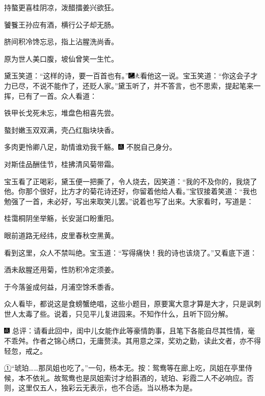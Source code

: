 持螯更喜桂阴凉，泼醋擂姜兴欲狂。

饕餮王孙应有酒，横行公子却无肠。

脐间积冷馋忘忌，指上沾腥洗尚香。

原为世人美口腹，坡仙曾笑一生忙。

黛玉笑道：``这样的诗，要一百首也有。''{\includegraphics[width=3mm]{../Images/00003}\includegraphics[width=3mm]{../Images/00012}\footnotesize \kaishu 看他这一说。}宝玉笑道：``你这会子才力已尽，不说不能作了，还贬人家。''黛玉听了，并不答言，也不思索，提起笔来一挥，已有了一首。众人看道：

铁甲长戈死未忘，堆盘色相喜先尝。

螯封嫩玉双双满，壳凸红脂块块香。

多肉更怜卿八足，助情谁劝我千觞。{\includegraphics[width=3mm]{../Images/00005}  \kaishu 不脱自己身分。}

对斯佳品酬佳节，桂拂清风菊带霜。

宝玉看了正喝彩，黛玉便一把撕了，令人烧去，因笑道：``我的不及你的，我烧了他。你那个很好，比方才的菊花诗还好，你留着他给人看。''宝钗接着笑道：``我也勉强了一首，未必好，写出来取笑儿罢。''说着也写了出来。大家看时，写道是：

桂霭桐阴坐举觞，长安涎口盼重阳。

眼前道路无经纬，皮里春秋空黑黄。

看到这里，众人不禁叫绝。宝玉道：``写得痛快！我的诗也该烧了。''又看底下道：

酒未敌腥还用菊，性防积冷定须姜。

于今落釜成何益，月浦空馀禾黍香。

众人看毕，都说这是食螃蟹绝唱，这些小题目，原要寓大意才算是大才，只是讽刺世人太毒了些。说着，只见平儿复进园来。不知作什么，且听下回分解。

{\includegraphics[width=3mm]{../Images/00005}  \kaishu 总评：请看此回中，闺中儿女能作此等豪情韵事，且笔下各能自尽其性情，毫不乖舛。作者之锦心绣口，无庸赘渎。其用意之深，奖劝之勤，读此文者，亦不得轻忽，戒之。}

{\href{../Text/part0042_split_000.html\#navto_1_a}{①}``琥珀\ldots{}\ldots{}那凤姐也吃了。''一句，杨本无。按：鸳鸯等在廊上吃，凤姐在亭里侍候，本不依礼。故鸳鸯也是凤姐索讨才给斟酒的，琥珀、彩霞二人不必响应。否则，这里仅五人，独彩云无表示，也不合适。当以杨本为是。}
